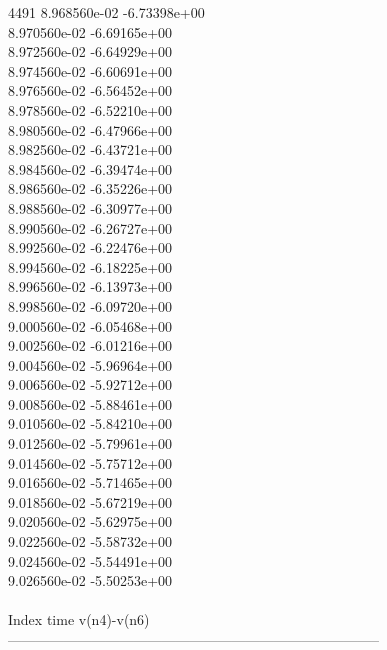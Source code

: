 4491	8.968560e-02	-6.73398e+00	\\ 	8.970560e-02	-6.69165e+00	\\ 	8.972560e-02	-6.64929e+00	\\ 	8.974560e-02	-6.60691e+00	\\ 	8.976560e-02	-6.56452e+00	\\ 	8.978560e-02	-6.52210e+00	\\ 	8.980560e-02	-6.47966e+00	\\ 	8.982560e-02	-6.43721e+00	\\ 	8.984560e-02	-6.39474e+00	\\ 	8.986560e-02	-6.35226e+00	\\ 	8.988560e-02	-6.30977e+00	\\ 	8.990560e-02	-6.26727e+00	\\ 	8.992560e-02	-6.22476e+00	\\ 	8.994560e-02	-6.18225e+00	\\ 	8.996560e-02	-6.13973e+00	\\ 	8.998560e-02	-6.09720e+00	\\ 	9.000560e-02	-6.05468e+00	\\ 	9.002560e-02	-6.01216e+00	\\ 	9.004560e-02	-5.96964e+00	\\ 	9.006560e-02	-5.92712e+00	\\ 	9.008560e-02	-5.88461e+00	\\ 	9.010560e-02	-5.84210e+00	\\ 	9.012560e-02	-5.79961e+00	\\ 	9.014560e-02	-5.75712e+00	\\ 	9.016560e-02	-5.71465e+00	\\ 	9.018560e-02	-5.67219e+00	\\ 	9.020560e-02	-5.62975e+00	\\ 	9.022560e-02	-5.58732e+00	\\ 	9.024560e-02	-5.54491e+00	\\ 	9.026560e-02	-5.50253e+00	\\ \hline
\\ \hline
Index   time            v(n4)-v(n6)     \\ \hline
--------------------------------------------------------------------------------\\ \hline
